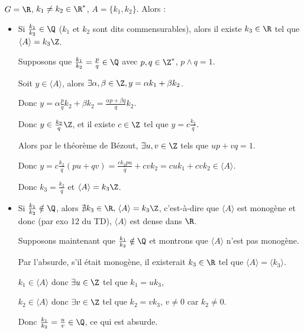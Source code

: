 \begin{exemple}
    $G = \R$, $k_1 \neq k_2 \in \R^*$, $A = \{k_1, k_2\}$. Alors : 

    \begin{itemize}
        \item Si $\frac{k_1}{k_2} \in \Q$ ($k_1$ et $k_2$ sont dits commensurables), alors il existe 
        $k_3 \in \R$ tel que $\langle A \rangle = k_3 \Z$.

        \svspace Supposons que $\frac{k_1}{k_2} = \frac p q \in \Q$ avec $p, q \in \Z^*$, $p \wedge q = 1$.

        Soit $y \in \langle A \rangle$, alors $\exists \alpha, \beta \in \Z, y = \alpha k_1 + \beta k_2$.

        Donc $\displaystyle y = \alpha \frac p q k_2 + \beta k_2 = \frac{\alpha p + \beta q} q k_2$.

        Donc $y \in \frac{k_2} q \Z$, et il existe $c \in \Z$ tel que $\displaystyle y = c \frac{k_2} q$.

        Alors par le théorème de Bézout, $\exists u, v \in \Z$ tels que $up + vq = 1$.

        Donc $\displaystyle y = c \frac{k_2} q (pu + qv) = \frac{c k_2 p u}{q} + cv k_2 = c u k_1 + cv k_2 \in \langle A \rangle$.

        Donc $k_3 = \frac{k_2} q$ et $\langle A \rangle = k_3 \Z$.

        \item Si $\frac{k_1}{k_2} \notin \Q$, alors $\nexists k_3 \in \R, \, \langle A \rangle = k_3 \Z$, 
        c'est-à-dire que $\langle A \rangle$ est monogène et donc (par exo 12 du TD), 
        $\langle A \rangle$ est dense dans $\R$.

        \svspace Supposons maintenant que $\frac{k_1}{k_2} \notin \Q$ et montrons 
        que $\langle A \rangle$ n'est pas monogène.

        Par l'absurde, s'il était monogène, il existerait $k_3 \in \R$ tel que
        $\langle A \rangle = \langle k_3 \rangle$. 

        $k_1 \in \langle A \rangle$ donc $\exists u \in \Z$ tel que $k_1 = u k_3$, 

        $k_2 \in \langle A \rangle$ donc $\exists v \in \Z$ tel que $k_2 = v k_3$, $v \neq 0$ car $k_2 \neq 0$.

        Donc $\frac{k_1}{k_2} = \frac u v \in \Q$, ce qui est absurde.
    \end{itemize}
\end{exemple}

